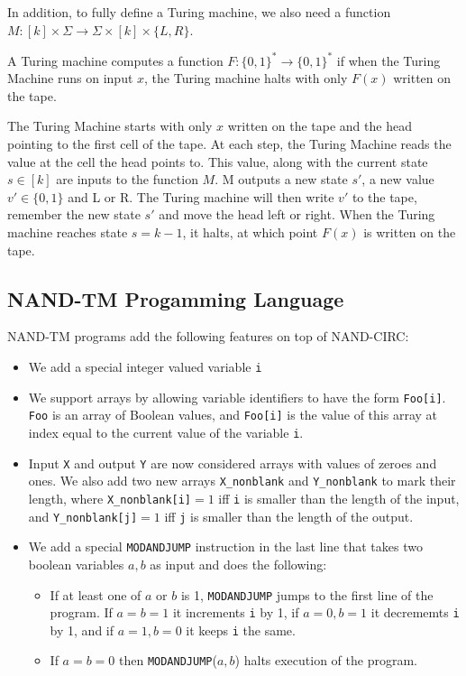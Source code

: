 \documentclass[11pt]{article}
\theoremstyle{definition}
\theoremstyle{remark}
\begin{document}
In addition, to fully define a Turing machine, we also need a function $M : [k] \times \Sigma \rightarrow   \Sigma \times [k] \times \{L, R\}$.

A Turing machine computes a function $F : \{0,1\}^* \rightarrow \{0,1\}^*$ if when the Turing Machine runs on input $x$, the Turing machine halts with only $F(x)$ written on the tape. 

The Turing Machine starts with only $x$ written on the tape and the head pointing to the first cell of the tape. At each step, the Turing Machine reads the value at the cell the head points to. This value, along with the current state $s \in [k]$ are inputs to the function $M$. M outputs a new state $s'$, a new value $v' \in \{0, 1\}$ and L or R. The Turing machine will then write $v'$ to the tape, remember the new state $s'$ and move the head left or right. When the Turing machine reaches state $s = k-1$, it halts, at which point $F(x)$ is written on the tape. 

\subsection{NAND-TM Progamming Language}
NAND-TM programs add the following features on top of NAND-CIRC:

\begin{itemize}

\item We add a special integer valued variable \texttt{i}

\item We support arrays by allowing variable identifiers to have the form \texttt{Foo[i]}. \texttt{Foo} is an array of Boolean values, and \texttt{Foo[i]} is the value of this array at index equal to the current value of the variable \texttt{i}.

\item Input \texttt{X} and output \texttt{Y} are now considered arrays with values of zeroes and ones. We also add two new arrays \texttt{X\_nonblank} and  \texttt{Y\_nonblank} to mark their length, where \texttt{X\_nonblank[i]}$=1$ iff \texttt{i} is smaller than the length of the input, and \texttt{Y\_nonblank[j]}$=1$ iff \texttt{j} is smaller than the length of the output.

\item We add a special \texttt{MODANDJUMP} instruction in the last line that takes two boolean variables $a,b$ as input and does the following:

\begin{itemize}
    \item If at least one of $a$ or $b$ is 1, \texttt{MODANDJUMP} jumps to the first line of the program. If $a=b=1$ it increments \texttt{i} by 1, if $a=0,b=1$ it decrememts \texttt{i} by 1, and if $a=1,b=0$ it keeps \texttt{i} the same.
    \item If $a=b=0$ then \texttt{MODANDJUMP}($a,b$) halts execution of the program.
\end{itemize}

\end{itemize}
\end{document}

